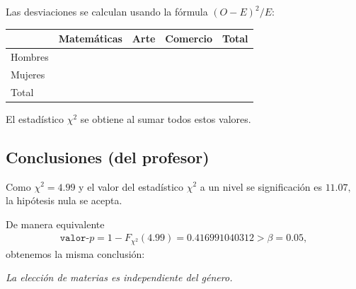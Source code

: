 Las desviaciones se calculan usando la fórmula
$(O-E)^2/E$:
\begin{center}
	\begin{tabular}{|l|l|l|l|l|}\hline
		& Matemáticas & Arte & Comercio & Total\\\hline
		Hombres &  &  &  & \\\hline
		Mujeres &  &  &  & \\\hline
		Total &  &  &  & \\\hline
	\end{tabular}
\end{center}

El estadístico $\chi^{2}$ se obtiene al sumar todos estos valores.

\subsection{Conclusiones (del profesor)}
Como $\chi^{2}= 4.99$ y el valor del estadístico $\chi^{2}$ a un nivel se significación es $11.07,$ la hipótesis nula se acepta.

De manera equivalente
\begin{align}
	\texttt{valor-}p=1- F_{\chi^{2}}(4.99)=0.416991040312>\beta=0.05,
\end{align}
obtenemos la misma conclusión:
\begin{center}
	\emph{La elección de materias es independiente del género.}
\end{center}


